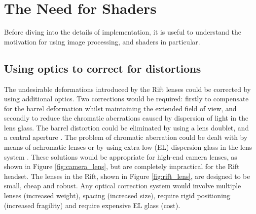 \documentclass[MSc,paper=a4,pagesize=auto]{icldt}
\begin{document}
\section{The Need for Shaders}
\label{sec:need_for_shaders}
Before diving into the details of implementation, it is useful to understand the motivation for using image processing, and shaders in particular. 

\subsection{Using optics to correct for distortions}
The undesirable deformations introduced by the Rift lenses could be corrected by using additional optics. Two corrections would be required: firstly to compensate for the barrel deformation whilst maintaining the extended field of view, and secondly to reduce the chromatic aberrations caused by dispersion of light in the lens glass. The barrel distortion could be eliminated by using a lens doublet, and a central aperture \cite{Brainerd2004}. The problem of chromatic aberration could be dealt with by means of achromatic lenses or by using extra-low (EL) dispersion glass in the lens system \cite{Davis2014}. These solutions would be appropriate for high-end camera lenses, as shown in Figure \ref{fig:camera_lens}, but are completely impractical for the Rift headset. The lenses in the Rift, shown in Figure \ref{fig:rift_lens}, are designed to be small, cheap and robust. Any optical correction system would involve multiple lenses (increased weight), spacing (increased size), require rigid positioning (increased fragility) and require expensive EL glass (cost).
\end{document}
